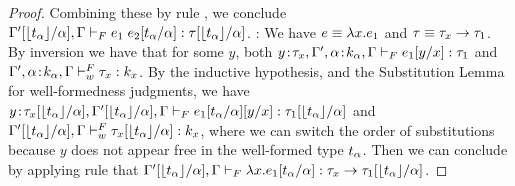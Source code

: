 \begin{proof}
Combining these by rule \fApp, we conclude
$\hasftype{\subst{\tcenv'}{\al}{\forgetreft{\stype_{\al}}}, \tcenv}{\subst{\app{\sexpr_1}{\sexpr_2}}{\tvar}{\stype_{\tvar}}}{\subst{\sftype}{\tvar}{\forgetreft{\stype_{\tvar}}}}$.
\pfcase{\fAbs}: We have $\sexpr \equiv \vabs{x}{\sexpr_1}$ 
and $\sftype \equiv \funcftype{\sftype_x}{\sftype_1}$. 
By inversion we have that for some $y$, both
$\hasftype{\bind{y}{\sftype_x},\tcenv', \bind{\al}{k_{\al}}, \tcenv}
{\subst{\sexpr_1}{x}{y}}{\sftype_1}$
and
$\isWFFT{\tcenv', \bind{\al}{k_{\al}}, \tcenv}{\sftype_x}{\skind_x}$.
By the inductive hypothesis, and the Substitution Lemma for 
well-formedness judgments, we have
$\hasftype{\bind{y}{\subst{\sftype_x}{\al}{\forgetreft{\stype_{\al}}}},\subst{\tcenv'}{\al}{\forgetreft{\stype_{\al}}}, \tcenv}
{\subst{\subst{\sexpr_1}{\al}{\stype_{\al}}}{x}{y}}{\subst{\sftype_1}{\al}{\forgetreft{\stype_{\al}}}}$
and
$\isWFFT{\subst{\tcenv'}{\al}{\forgetreft{\stype_{\al}}}, \tcenv}
{\subst{\sftype_x}{\al}{\forgetreft{\stype_{\al}}}}{\skind_x}$,
where we can switch the order of substitutions because $y$ does not 
appear free in the well-formed type $\stype_{\tvar}$.
Then we can conclude by applying rule \fAbs that 
$\hasftype{\subst{\tcenv'}{\al}{\forgetreft{\stype_{\al}}}, \tcenv}
{\subst{\vabs{x}{\sexpr_1}}{\tvar}{\stype_\tvar}}
{\subst{\funcftype{\sftype_x}{\sftype_1}}{\tvar}{\forgetreft{\stype_\tvar}}}$.




\end{proof}
